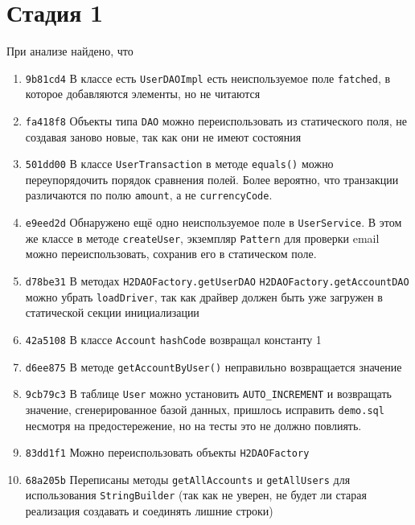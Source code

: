 \documentclass{article}
\begin{document}
	\section*{Стадия 1}
		При анализе найдено, что
	\begin{enumerate}
		\item \texttt{9b81cd4} В классе есть \texttt{UserDAOImpl} есть неиспользуемое поле \texttt{fatched}, в которое добавляются элементы, но не читаются 
		\item \texttt{fa418f8} Объекты типа \texttt{DAO} можно переиспользовать из статического поля, не создавая заново новые, так как они не имеют состояния 
		\item \texttt{501dd00} В классе \texttt{UserTransaction} в методе \texttt{equals()} можно переупорядочить порядок сравнения полей.
		Более вероятно, что транзакции различаются по полю \texttt{amount}, а не \texttt{currencyCode}.
		\item \texttt{e9eed2d} Обнаружено ещё одно неиспользуемое поле в \texttt{UserService}. 
		В этом же классе в методе \texttt{createUser}, экземпляр \texttt{Pattern} для проверки email можно переиспользовать, сохранив его в статическом поле.
		\item \texttt{d78be31} В методах \texttt{H2DAOFactory.getUserDAO} \texttt{H2DAOFactory.getAccountDAO} можно убрать \texttt{loadDriver}, так как драйвер должен быть уже загружен в статической секции инициализации
		\item \texttt{42a5108} В классе \texttt{Account} \texttt{hashCode} возвращал константу 1
		\item \texttt{d6ee875} В методе \texttt{getAccountByUser()} неправильно возвращается значение
		\item \texttt{9cb79c3} В таблице \texttt{User} можно установить \texttt{AUTO\_INCREMENT} и возвращать значение, сгенерированное базой данных, 
		пришлось исправить \texttt{demo.sql} несмотря на предостережение, но на тесты это не должно повлиять.
		\item \texttt{83dd1f1} Можно переиспользовать объекты \texttt{H2DAOFactory}
		\item \texttt{68a205b} Переписаны методы \texttt{getAllAccounts} и \texttt{getAllUsers} для использования \texttt{StringBuilder} (так как не уверен, не будет ли старая реализация создавать и соединять лишние строки)
	\end{enumerate}		


	\newpage
\end{document}

